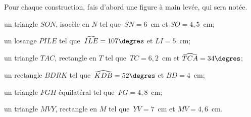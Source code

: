 Pour chaque construction, fais d'abord une figure à main levée, qui sera notée.
\begin{myenumerate}
  \item un triangle $SON$, isocèle en $N$ tel que $SN=6$~cm et $SO=4,5$~cm;
  \item un losange $PILE$ tel que $\widehat{ILE}=107\degres$ et $LI=5$~cm;
  \item un triangle $TAC$, rectangle en $T$ tel que $TC=6,2$~cm et $\widehat{TCA}=34\degres$;
  \item un rectangle $BDRK$ tel que $\widehat{KDB}=52\degres$ et $BD=4$~cm;
  \item un triangle $FGH$ équilatéral tel que $FG=4,8$~cm;
  \item un triangle $MVY$, rectangle en $M$ tel que $YV=7$~cm et $MV=4,6$~cm.
\end{myenumerate}